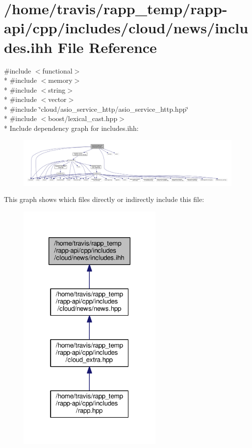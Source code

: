 \hypertarget{cloud_2news_2includes_8ihh}{\section{/home/travis/rapp\-\_\-temp/rapp-\/api/cpp/includes/cloud/news/includes.ihh File Reference}
\label{cloud_2news_2includes_8ihh}
}
{\ttfamily \#include $<$functional$>$}\\*
{\ttfamily \#include $<$memory$>$}\\*
{\ttfamily \#include $<$string$>$}\\*
{\ttfamily \#include $<$vector$>$}\\*
{\ttfamily \#include \char`\"{}cloud/asio\-\_\-service\-\_\-http/asio\-\_\-service\-\_\-http.\-hpp\char`\"{}}\\*
{\ttfamily \#include $<$boost/lexical\-\_\-cast.\-hpp$>$}\\*
Include dependency graph for includes.\-ihh\-:
\nopagebreak
\begin{figure}[H]
\begin{center}
\leavevmode
\includegraphics[width=350pt]{cloud_2news_2includes_8ihh__incl}
\end{center}
\end{figure}
This graph shows which files directly or indirectly include this file\-:
\nopagebreak
\begin{figure}[H]
\begin{center}
\leavevmode
\includegraphics[width=202pt]{cloud_2news_2includes_8ihh__dep__incl}
\end{center}
\end{figure}
